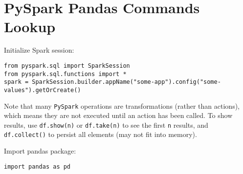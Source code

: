 \documentclass{article}
\begin{document}
\section*{PySpark Pandas Commands Lookup}

Initialize Spark session: 
\begin{verbatim}
from pyspark.sql import SparkSession
from pyspark.sql.functions import *
spark = SparkSession.builder.appName("some-app").config("some-values").getOrCreate()
\end{verbatim}

\noindent
Note that many \verb|PySpark| operations are transformations (rather than actions), which means they are not executed until an action has been called. To show results, use \verb|df.show(n)| or \verb|df.take(n)| to see the first \verb|n| results, and \verb|df.collect()| to persist all elements (may not fit into memory).
\newline

\noindent
Import pandas package: 
\begin{verbatim}
import pandas as pd
\end{verbatim}
\end{document}
